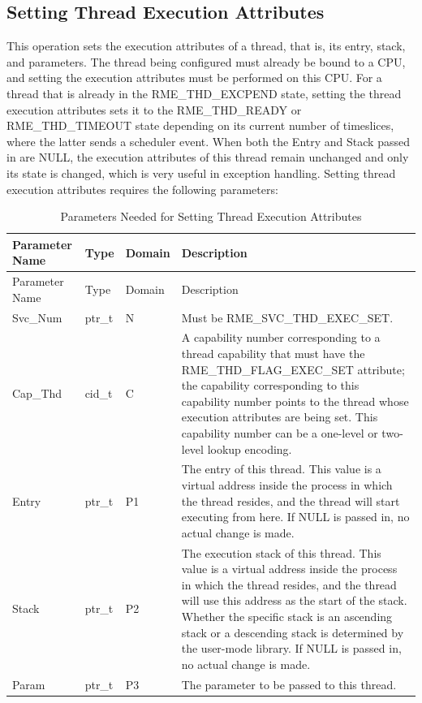 \newpage
\subsection{Setting Thread Execution Attributes}\label{subsec:4-set-thread-execution-attributes}

This operation sets the execution attributes of a thread, that is, its entry, stack, and parameters. The thread being configured must already be bound to a CPU, and setting the execution attributes must be performed on this CPU. For a thread that is already in the RME\_THD\_EXCPEND state, setting the thread execution attributes sets it to the RME\_THD\_READY or RME\_THD\_TIMEOUT state depending on its current number of timeslices, where the latter sends a scheduler event. When both the Entry and Stack passed in are NULL, the execution attributes of this thread remain unchanged and only its state is changed, which is very useful in exception handling. Setting thread execution attributes requires the following parameters:

\begin{xltabular}{\textwidth}{@{}>{\hsize\raggedright\arraybackslash}X>{\hsize\raggedright\arraybackslash}X>{\hsize\raggedright\arraybackslash}X>{\hsize\raggedright\arraybackslash}X@{}}
\caption{Parameters Needed for Setting Thread Execution Attributes}\label{tab:4-28-set-thread-execution-attributes-parameters}\\
\toprule
Parameter Name & Type & Domain & Description\tabularnewline
\endfirsthead
\toprule
Parameter Name & Type & Domain & Description\tabularnewline
\midrule
\endhead
\bottomrule
\endlastfoot
Svc\_Num & ptr\_t & N & Must be RME\_SVC\_THD\_EXEC\_SET.\tabularnewline
Cap\_Thd & cid\_t & C &
A capability number corresponding to a thread capability that must have the RME\_THD\_FLAG\_EXEC\_SET attribute; the capability corresponding to this capability number points to the thread whose execution attributes are being set. This capability number can be a one-level or two-level lookup encoding.\tabularnewline
Entry & ptr\_t & P1 &
The entry of this thread. This value is a virtual address inside the process in which the thread resides, and the thread will start executing from here. If NULL is passed in, no actual change is made.\tabularnewline
Stack & ptr\_t & P2 &
The execution stack of this thread. This value is a virtual address inside the process in which the thread resides, and the thread will use this address as the start of the stack. Whether the specific stack is an ascending stack or a descending stack is determined by the user-mode library. If NULL is passed in, no actual change is made.\tabularnewline
Param & ptr\_t & P3 & The parameter to be passed to this thread.\tabularnewline
\end{xltabular}
\nopagebreak[4]

